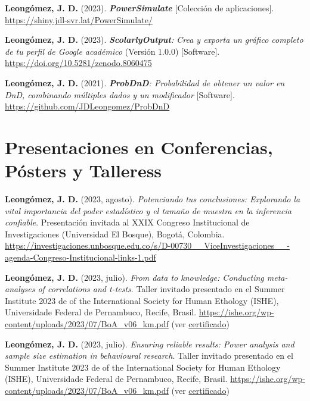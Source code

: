 \documentclass[11pt,a4paper,]{awesome-cv}
\begin{document}
\begingroup
\footnotesize
\setlength{\parindent}{-0.5in}
\setlength{\leftskip}{0.5in}

\textbf{Leongómez, J. D.} (2023). \textbf{\emph{PowerSimulate}}
{[}Colección de aplicaciones{]}.
\url{https://shiny.jdl-svr.lat/PowerSimulate/}

\textbf{Leongómez, J. D.} (2023). \emph{\textbf{ScolarlyOutput}: Crea y
exporta un gráfico completo de tu perfil de Google académico} (Versión
1.0.0) {[}Software{]}.
\href{https://github.com/JDLeongomez/ScholarlyOutput_ES}{https://doi.org/10.5281/zenodo.8060475}

\textbf{Leongómez, J. D.} (2021). \emph{\textbf{ProbDnD}: Probabilidad
de obtener un valor en DnD, combinando múltiples dados y un modificador}
{[}Software{]}. \url{https://github.com/JDLeongomez/ProbDnD}

\endgroup

\hypertarget{presentaciones-en-conferencias-puxf3sters-y-talleress}{%
\section{Presentaciones en Conferencias, Pósters y
Talleress}\label{presentaciones-en-conferencias-puxf3sters-y-talleress}}

\begingroup
\footnotesize
\setlength{\parindent}{-0.5in}
\setlength{\leftskip}{0.5in}

\textbf{Leongómez, J. D.} (2023, agosto). \emph{Potenciando tus
conclusiones: Explorando la vital importancia del poder estadístico y el
tamaño de muestra en la inferencia confiable}. Presentación invitada al
XXIX Congreso Institucional de Investigaciones (Universidad El Bosque),
Bogotá, Colombia.
\url{https://investigaciones.unbosque.edu.co/s/D-00730__ViceInvestigaciones__-agenda-Congreso-Institucional-links-1.pdf}

\textbf{Leongómez, J. D.} (2023, julio). \emph{From data to knowledge:
Conducting meta-analyses of correlations and t-tests}. Taller invitado
presentado en el Summer Institute 2023 de of the International Society
for Human Ethology (ISHE), Universidade Federal de Pernambuco, Recife,
Brasil. \url{https://ishe.org/wp-content/uploads/2023/07/BoA_v06_km.pdf}
(ver
\href{https://jdleongomez.info/es/files/Cert_ISHE_2023.pdf}{certificado})

\textbf{Leongómez, J. D.} (2023, julio). \emph{Ensuring reliable
results: Power analysis and sample size estimation in behavioural
research}. Taller invitado presentado en el Summer Institute 2023 de of
the International Society for Human Ethology (ISHE), Universidade
Federal de Pernambuco, Recife, Brasil.
\url{https://ishe.org/wp-content/uploads/2023/07/BoA_v06_km.pdf} (ver
\href{https://jdleongomez.info/es/files/Cert_ISHE_2023.pdf}{certificado})
\end{document}
